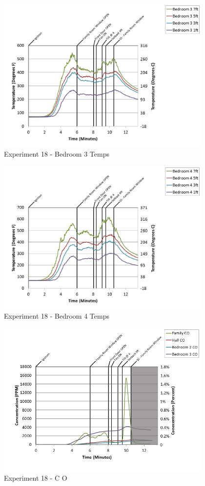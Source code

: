 \documentclass{article}
\begin{document}
\begin{appendices}
\clearpage

\begin{figure}[h!]
	\centering
	\includegraphics[height=3.05in]{0_Images/Results_Charts/Exp_18_Charts/Bedroom3Temps.png}
	\caption{Experiment 18 - Bedroom 3 Temps}
\end{figure}


\begin{figure}[h!]
	\centering
	\includegraphics[height=3.05in]{0_Images/Results_Charts/Exp_18_Charts/Bedroom4Temps.png}
	\caption{Experiment 18 - Bedroom 4 Temps}
\end{figure}

\clearpage

\begin{figure}[h!]
	\centering
	\includegraphics[height=3.05in]{0_Images/Results_Charts/Exp_18_Charts/CO.png}
	\caption{Experiment 18 - C O}
\end{figure}



\end{appendices}
\end{document}
